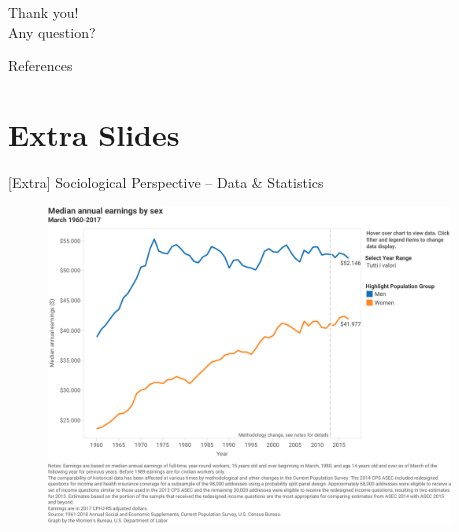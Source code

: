 \documentclass[usenames,dvipsnames]{beamer}
\begin{document}
    
    \begin{frame}
        \centering \huge Thank you!\\
        \vspace{\baselineskip}
        \centering \Large Any question?
    \end{frame}
    
    
    \begin{frame}{References}
        \printbibliography
    \end{frame}
    
    
    \section[]{Extra Slides}
    \begin{frame}[noframenumbering]{[Extra] Sociological Perspective -- Data \& Statistics}
        \begin{figure}
            \begin{columns}
                \begin{column}{0.675\linewidth}
                    \vspace{\medskipamount}
                    \centering
                    \includegraphics[width=\textwidth]{figures/dol_earnings_by_sex.pdf}
                \end{column}
                \begin{column}{.275\linewidth}
                \end{column}
            \end{columns}
        \end{figure}
    \end{frame}
    
\end{document}
